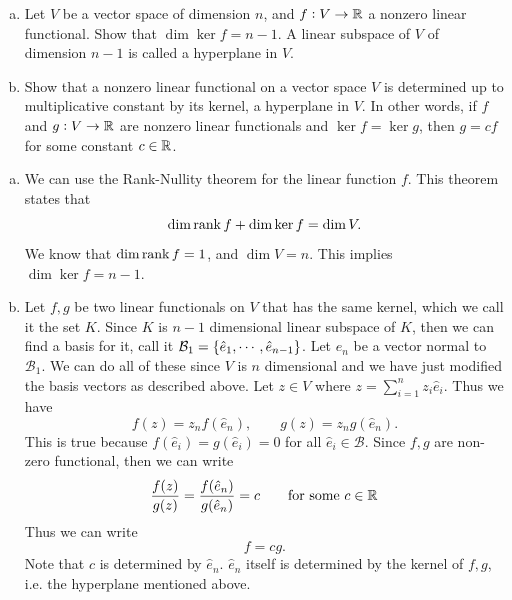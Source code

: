 \begin{problem}
	\begin{enumerate}[(a)]
		\item Let $ V $ be a vector space of dimension $ n $, and $ f:V \to \mathbb{R}$ a nonzero linear functional. Show that $ \dim \ker f  = n-1 $. A linear subspace of $ V $ of dimension $ n-1 $ is called a hyperplane in $ V $.
		\item Show that a nonzero linear functional on a vector space $ V $ is determined up to multiplicative constant by its kernel, a hyperplane in $ V $. In other words, if $ f $ and $ g : V \to \mathbb{R} $ are nonzero linear functionals and $ \ker f = \ker g $, then $ g = cf $ for some constant $ c \in \mathbb{R} $.
	\end{enumerate}
	
\end{problem}

\begin{solution}
	\begin{enumerate}[(a)]
		\item 	We can use the Rank-Nullity theorem for the linear function $ f $. This theorem states that 
		\[ \dim \rank f + \dim \ker f = \dim V. \]
		We know that $ \dim\rank f = 1 $, and $ \dim V = n $. This implies $ \dim\ker f = n-1 $.
		
		\item Let $ f,g $ be two linear functionals on $ V $ that has the same kernel, which we call it the set $ K $. Since $ K $ is $ n-1 $ dimensional linear subspace of $ K $, then we can find a basis for it, call it $ \mathcal{B}_1 = \{\hat{e}_1,\cdots , \hat{e}_{n-1}\} $. Let $ \hat{e}_n $ be a vector normal to $ \mathcal{B}_1 $. We can do all of these since $ V $ is $ n $ dimensional and we have just modified the basis vectors as described above. Let $ z\in V $ where $ z = \sum_{i=1}^{n} z_i \hat{e}_i $. Thus we have
		\[ f(z) = z_n f(\hat{e}_n), \qquad g(z) = z_n g(\hat{e}_n). \]
		This is true because $ f(\hat{e}_i) = g(\hat{e}_i) = 0 $ for all $ \hat{e}_i \in \mathcal{B} $. Since $ f,g $ are non-zero functional, then we can write
		\[ \frac{f(z)}{g(z)} = \frac{f(\hat{e}_n)}{g(\hat{e}_n)} = c \qquad \text{for some $ c\in \mathbb{R} $}\]
		Thus we can write
		\[ f = cg. \]
		Note that $ c $ is determined by $ \hat{e}_n $. $ \hat{e}_n $ itself is determined by the kernel of $ f,g $, i.e. the hyperplane mentioned above.
	\end{enumerate}
\end{solution}

